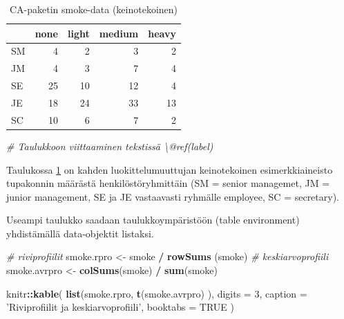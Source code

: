 \documentclass[finnish,]{book}
\newenvironment{Shaded}{\begin{snugshade}}{\end{snugshade}}
\newcommand{\CommentTok}[1]{\textcolor[rgb]{0.56,0.35,0.01}{\textit{#1}}}
\newcommand{\DataTypeTok}[1]{\textcolor[rgb]{0.13,0.29,0.53}{#1}}
\newcommand{\DecValTok}[1]{\textcolor[rgb]{0.00,0.00,0.81}{#1}}
\newcommand{\KeywordTok}[1]{\textcolor[rgb]{0.13,0.29,0.53}{\textbf{#1}}}
\newcommand{\NormalTok}[1]{#1}
\newcommand{\OperatorTok}[1]{\textcolor[rgb]{0.81,0.36,0.00}{\textbf{#1}}}
\newcommand{\OtherTok}[1]{\textcolor[rgb]{0.56,0.35,0.01}{#1}}
\newcommand{\StringTok}[1]{\textcolor[rgb]{0.31,0.60,0.02}{#1}}
\theoremstyle{definition}
\theoremstyle{definition}
\theoremstyle{definition}
\theoremstyle{remark}
\begin{document}
\begin{table}

\caption{\label{tab:smoketable1}CA-paketin smoke-data (keinotekoinen)}
\centering
\begin{tabular}[t]{lrrrr}
\toprule
  & none & light & medium & heavy\\
\midrule
SM & 4 & 2 & 3 & 2\\
JM & 4 & 3 & 7 & 4\\
SE & 25 & 10 & 12 & 4\\
JE & 18 & 24 & 33 & 13\\
SC & 10 & 6 & 7 & 2\\
\bottomrule
\end{tabular}
\end{table}

\begin{Shaded}
\begin{Highlighting}[]
\CommentTok{# Taulukkoon viittaaminen tekstissä \textbackslash{}@ref(label)}
\end{Highlighting}
\end{Shaded}

Taulukossa \ref{tab:smoketable1} on kahden luokittelumuuttujan
keinotekoinen esimerkkiaineisto tupakonnin määrästä henkilöstöryhmittäin
(SM = senior managemet, JM = junior management, SE ja JE vastaavasti
ryhmälle employee, SC = secretary).

Useampi taulukko saadaan taulukkoympäristöön (table environment)
yhdistämällä data-objektit listaksi.

\begin{Shaded}
\begin{Highlighting}[]
\CommentTok{# riviprofiilit}
\NormalTok{smoke.rpro <-}\StringTok{ }\NormalTok{smoke }\OperatorTok{/}\StringTok{ }\KeywordTok{rowSums}\NormalTok{ (smoke)}
\CommentTok{# keskiarvoprofiili}
\NormalTok{smoke.avrpro <-}\StringTok{ }\KeywordTok{colSums}\NormalTok{(smoke) }\OperatorTok{/}\StringTok{ }\KeywordTok{sum}\NormalTok{(smoke)}

\NormalTok{knitr}\OperatorTok{::}\KeywordTok{kable}\NormalTok{(}
  \KeywordTok{list}\NormalTok{(smoke.rpro, }\KeywordTok{t}\NormalTok{(smoke.avrpro)   ), }\DataTypeTok{digits =} \DecValTok{3}\NormalTok{,}
  \DataTypeTok{caption =} \StringTok{'Riviprofiilit ja keskiarvoprofiili'}\NormalTok{, }\DataTypeTok{booktabs =} \OtherTok{TRUE}
\NormalTok{)}
\end{Highlighting}
\end{Shaded}
\end{document}
